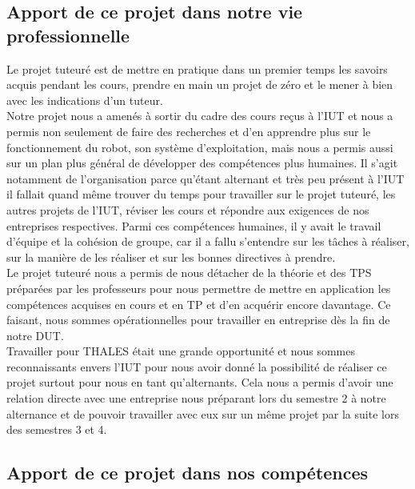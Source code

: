 \documentclass{PackagerQualityN}
\begin{document}


\subsection{Apport de ce projet dans notre vie professionnelle}

Le projet tuteuré est de mettre en pratique dans un premier temps les savoirs acquis pendant les cours, prendre en main un projet de zéro et le mener à bien avec les indications d’un tuteur.\\

Notre projet nous a amenés à sortir du cadre des cours reçus à l’IUT et nous a permis non seulement de faire des recherches et d’en apprendre plus sur le fonctionnement du robot, son système d’exploitation, mais nous a permis aussi sur un plan plus général de développer des compétences plus humaines. Il s’agit notamment de l’organisation parce qu’étant alternant et très peu présent à l’IUT il fallait quand même trouver du temps pour travailler sur le projet tuteuré, les autres projets de l’IUT, réviser les cours et répondre aux exigences de nos entreprises respectives. Parmi ces compétences humaines, il y avait le travail d’équipe et la cohésion de groupe, car il a fallu s’entendre sur les tâches à réaliser, sur la manière de les réaliser et sur les bonnes directives à prendre.\\

Le projet tuteuré nous a permis de nous détacher de la théorie et des TPS préparées par les professeurs pour nous permettre de mettre en application les compétences acquises en cours et en TP et d’en acquérir encore davantage. Ce faisant, nous sommes opérationnelles pour travailler en entreprise dès la fin de notre DUT.\\

Travailler pour THALES était une grande opportunité et nous sommes reconnaissants envers l’IUT pour nous avoir donné la possibilité de réaliser ce projet surtout pour nous en tant qu’alternants. Cela nous a permis d’avoir une relation directe avec une entreprise nous préparant lors du semestre 2 à notre alternance et de pouvoir travailler avec eux sur un même projet par la suite lors des semestres 3 et 4.

\subsection{Apport de ce projet dans nos compétences}
\end{document}
